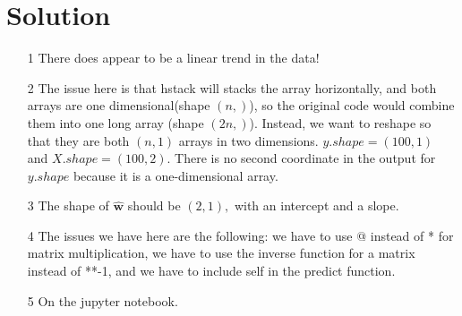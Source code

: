 \documentclass{../harvardml}
\theoremstyle{definition}
\theoremstyle{plain}
\newenvironment{solution}
  {\color{blue}\section*{Solution}}
{}
\begin{document}
\begin{solution}
	\begin{itemize}
        \item[1] There does appear to be a linear trend in the data!
        \item[2] The issue here is that hstack will stacks the array horizontally, and both arrays are one dimensional(shape $(n, )$), so the original code would combine them into one long array (shape $(2n,)$). Instead, we want to reshape so that they are both $(n, 1)$ arrays in two dimensions. 
        $y.shape = (100, 1)$ and $X.shape = (100, 2).$ There is no second coordinate in the output for $y.shape$ because it is a one-dimensional array.
        \item[3] The shape of $\bm{\hat w}$ should be $(2, 1),$ with an intercept and a slope.
        \item[4] The issues we have here are the following: we have to use @ instead of * for matrix multiplication, we have to use the inverse function for a matrix instead of **{-1}, and we have to include self in the predict function.
        \item[5] On the jupyter notebook.
    \end{itemize}
\end{solution}
\end{document}
